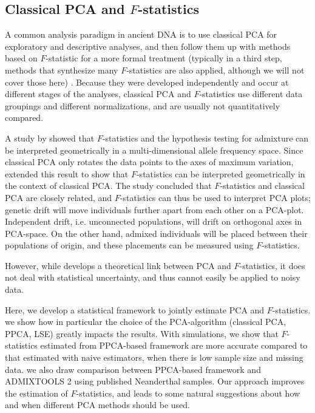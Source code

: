 \documentclass[12pt]{article}
\begin{document}
\subsection{Classical PCA and $F$-statistics}
A common analysis paradigm in ancient DNA is to use classical PCA for exploratory and descriptive analyses, and then follow them up with methods based on $F$-statistic for a more formal treatment (typically in a third step, methods that synthesize many $F$-statistics are also applied, although we will not cover those here) \citep{orlando_ancient_2021}. Because they were developed independently and occur at different stages of the analyses, classical PCA and $F$-statistics use different data groupings and different normalizations, and are usually not quantitatively compared. 

A study by \cite{oteo-garcia_geometrical_2021} showed that $F$-statistics and the hypothesis testing for admixture can be interpreted geometrically in a multi-dimensional allele frequency space. Since classical PCA only rotates the data points to the axes of maximum variation, \cite{peter_geometric_2022} extended this result to show that $F$-statistics can be interpreted geometrically in the context of classical PCA. The study concluded that $F$-statistics and classical PCA are closely related, and $F$-statistics can thus be used to interpret PCA plots; genetic drift will move individuals further apart from each other on a PCA-plot. Independent drift, i.e. unconnected populations, will drift on orthogonal axes in PCA-space. On the other hand, admixed individuals will be placed between their populations of origin, and these placements can be measured using $F$-statistics.  

However, while \citep{peter_geometric_2022} develops a theoretical link between PCA and $F$-statistics, it does not deal with statistical uncertainty, and thus cannot easily be applied to noisy data. 

Here, we develop a statistical framework to jointly estimate PCA and $F$-statistics. we show how in particular the choice of the PCA-algorithm (classical PCA, PPCA, LSE) greatly impacts the results. With simulations, we show that $F$-statistics estimated from PPCA-based framework are more accurate compared to that estimated with naive estimators, when there is low sample size and missing data. we also draw comparison between PPCA-based framework and ADMIXTOOLS 2 using published Neanderthal samples. Our approach improves the estimation of $F$-statistics, and leads to some natural suggestions about how and when different PCA methods should be used.
\end{document}
